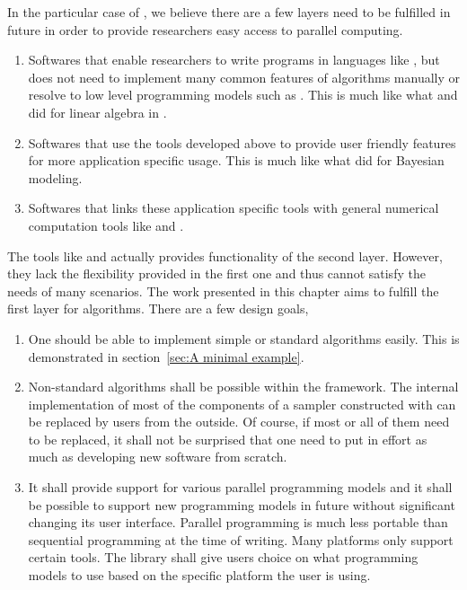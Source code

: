 In the particular case of \smc, we believe there are a few layers need to be
fulfilled in future in order to provide researchers easy access to parallel
computing.
\begin{enumerate}
  \item Softwares that enable researchers to write programs in languages like
    \cpp, but does not need to implement many common features of algorithms
    manually or resolve to low level programming models such as \tbb. This is
    much like what \armadillo and \eigen did for linear algebra in \cpp.
  \item Softwares that use the tools developed above to provide user friendly
    features for more application specific usage. This is much like what \bugs
    did for Bayesian modeling.
  \item Softwares that links these application specific tools with general
    numerical computation tools like \matlab and \rlang.
\end{enumerate}
The tools like \biips and \libbi actually provides functionality of the second
layer. However, they lack the flexibility provided in the first one and thus
cannot satisfy the needs of many scenarios. The work presented in this chapter
aims to fulfill the first layer for \smc algorithms. There are a few
design goals,
\begin{enumerate}
  \item One should be able to implement simple or standard algorithms easily.
    This is demonstrated in section~\ref{sec:A minimal example}.
  \item Non-standard algorithms shall be possible within the framework. The
    internal implementation of most of the components of a sampler constructed
    with \vsmc can be replaced by users from the outside. Of course, if most
    or all of them need to be replaced, it shall not be surprised that one
    need to put in effort as much as developing new software from scratch.
  \item It shall provide support for various parallel programming models and
    it shall be possible to support new programming models in future without
    significant changing its user interface. Parallel programming is much less
    portable than sequential programming at the time of writing. Many
    platforms only support certain tools. The library shall give users choice
    on what programming models to use based on the specific platform the user
    is using.
\end{enumerate}

